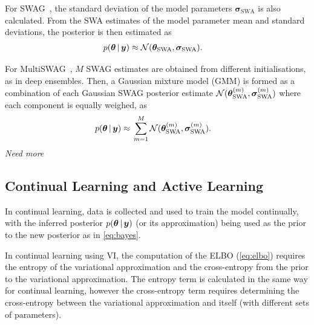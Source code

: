\documentclass[10pt,a4paper,twocolumn]{article}
\begin{document}
For SWAG~\cite{maddox2019simple}, the standard deviation of the model parameters \(\bm \sigma_\mathrm{SWA}\) is also calculated.
From the SWA estimates of the model parameter mean and standard deviations, the posterior is then estimated as
\begin{align}\label{eq:swag}
    p(\bm \theta \, | \, \bm y) \approx{}& \mathcal{N}(\bm \theta_\mathrm{SWA}, \bm \sigma_\mathrm{SWA}).
\end{align}

For MultiSWAG~\cite{wilson2020bayesian}, \(M\) SWAG estimates are obtained from different initialisations, as in deep ensembles.
Then, a Gaussian mixture model (GMM) is formed as a combination of each Gaussian SWAG posterior estimate \(\mathcal{N}(\bm \theta_\mathrm{SWA}^{(m)}, \bm \sigma_\mathrm{SWA}^{(m)})\) where each component is equally weighed, as
\begin{align}\label{eq:multiswag}
    p(\bm \theta \, | \, \bm y) \approx{}& \sum_{m=1}^M \mathcal{N}(\bm \theta_\mathrm{SWA}^{(m)}, \bm \sigma_\mathrm{SWA}^{(m)}).
\end{align}
\emph{Need more}



\subsection{Continual Learning and Active Learning}

In continual learning, data is collected and used to train the model continually, with the inferred posterior \(p(\bm \theta \, | \, \bm y)\) (or its approximation) being used as the prior to the new posterior as in \cref{eq:bayes}.

\cite{nguyen2017variational}

In continual learning using VI, the computation of the ELBO (\cref{eq:elbo}) requires the entropy of the variational approximation and the cross-entropy from the prior to the variational approximation.
The entropy term is calculated in the same way for continual learning, however the cross-entropy term requires determining the cross-entropy between the variational approximation and itself (with different sets of parameters).
\end{document}
